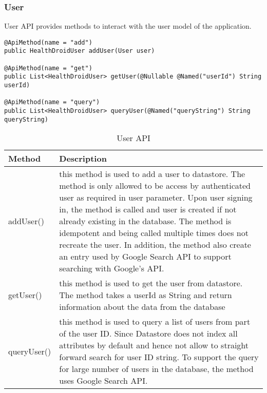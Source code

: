 \subsubsection{User}
User API provides methods to interact with the user model of the application.
\begin{minipage}{\linewidth}
\begin{lstlisting}
@ApiMethod(name = "add")
public HealthDroidUser addUser(User user)

@ApiMethod(name = "get")
public List<HealthDroidUser> getUser(@Nullable @Named("userId") String userId)

@ApiMethod(name = "query")
public List<HealthDroidUser> queryUser(@Named("queryString") String queryString)
\end{lstlisting}
\end{minipage}

\begin{table}
\begin{center}
    \begin{tabularx}{\textwidth}{| l | X |}
        \hline Method & Description \\
        \hline addUser() & 
            this method is used to add a user to datastore. The method is only allowed to be access by
            authenticated user as required in user parameter. Upon user signing in, the method is called and user is
            created if not already existing in the database. The method is idempotent and being called multiple times
            does not recreate the user. In addition, the method also create an entry used by Google Search API to
            support searching with Google's API.  \\
        \hline getUser() &
            this method is used to get the user from datastore. The method takes a userId as String and return
            information about the data from the database \\
        \hline queryUser() &
            this method is used to query a list of users from part of the user ID. Since Datastore does not index all
            attributes by default and hence not allow to straight forward search for user ID string. To support the
            query for large number of users in the database, the method uses Google Search API. \\
        \hline
    \end{tabularx}
\end{center}
    \caption{User API}
\end{table}

